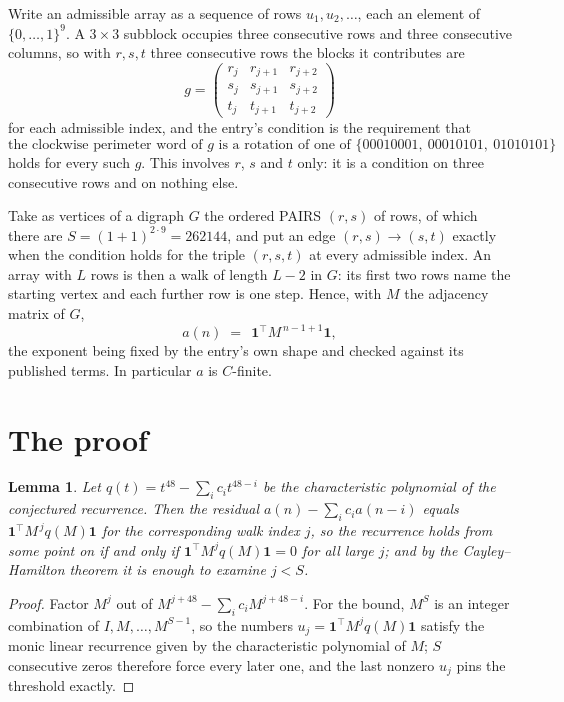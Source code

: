 \documentclass[11pt,a4paper]{article}
\theoremstyle{plain}
\newtheorem{lemma}[theorem]{Lemma}
\theoremstyle{definition}
\begin{document}
Write an admissible array as a sequence of rows $u_1,u_2,\dots$, each an element of
$\{0,\dots,1\}^{9}$. A $3\times3$ subblock occupies three consecutive rows and
three consecutive columns, so with $r,s,t$ three consecutive rows the blocks it
contributes are
\[
g=\begin{pmatrix}r_j&r_{j+1}&r_{j+2}\\ s_j&s_{j+1}&s_{j+2}\\ t_j&t_{j+1}&t_{j+2}\end{pmatrix}
\]
for each admissible index, and the entry's condition is the requirement that
\[
\text{the clockwise perimeter word of }g\text{ is a rotation of one of }\{00010001,\ 00010101,\ 01010101\}
\]
holds for every such $g$. This involves $r$, $s$ and $t$ only: it is a condition on
three consecutive rows and on nothing else.

Take as vertices of a digraph $G$ the ordered PAIRS $(r,s)$ of rows, of which there are
$S=(1+1)^{2\cdot9}=262144$, and put an edge $(r,s)\to(s,t)$ exactly when the condition
holds for the triple $(r,s,t)$ at every admissible index. An array with $L$ rows is then a
walk of length $L-2$ in $G$: its first two rows name the starting vertex and each further
row is one step. Hence, with $M$ the adjacency matrix of $G$,
\[
a(n)\;=\;\,\mathbf{1}^{\!\top}M^{\,n-1+1}\mathbf{1},
\]
the exponent being fixed by the entry's own shape and checked against its published terms.
In particular $a$ is $C$-finite.

\section{The proof}

\begin{lemma}\label{lem:crit}
Let $q(t)=t^{48}-\sum_i c_it^{48-i}$ be the characteristic polynomial of the
conjectured recurrence. Then the residual $a(n)-\sum_ic_ia(n-i)$ equals
$\mathbf{1}^{\!\top}M^{\,j}q(M)\mathbf{1}$ for the corresponding walk index
$j$, so the recurrence holds from some point on if and only if
$\mathbf{1}^{\!\top}M^{j}q(M)\mathbf{1}=0$ for all large $j$; and by the
Cayley--Hamilton theorem it is enough to examine $j<S$.
\end{lemma}

\begin{proof}
Factor $M^{j}$ out of $M^{j+48}-\sum_ic_iM^{j+48-i}$. For the bound, $M^{S}$
is an integer combination of $I,M,\dots,M^{S-1}$, so the numbers
$u_j=\mathbf{1}^{\!\top}M^{j}q(M)\mathbf{1}$ satisfy the monic linear recurrence given by
the characteristic polynomial of $M$; $S$ consecutive zeros therefore force every later one,
and the last nonzero $u_j$ pins the threshold exactly.
\end{proof}
\end{document}
